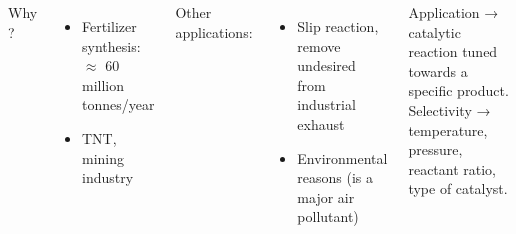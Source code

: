 \begin{frame}
\begin{columns}
            \medskip
            \pause
            Why \nitricacid ?
            \begin{itemize}
                \pause
                \item Fertilizer synthesis: $\approx$ 60 million tonnes/year
                \pause
                \item TNT, mining industry
            \end{itemize}            

            \medskip
            \pause
            Other applications:
            \begin{itemize}
                \item Slip reaction, remove undesired \ammonia from industrial exhaust
                \pause
                \item Environmental reasons (\ammonia is a major air pollutant)
            \end{itemize}
            
            \medskip
            \color{Important}
                \pause
                Application → catalytic reaction tuned towards a specific product.\\
                \pause
                Selectivity → temperature, pressure, reactant ratio, type of catalyst.

    \end{columns}    
\end{frame}